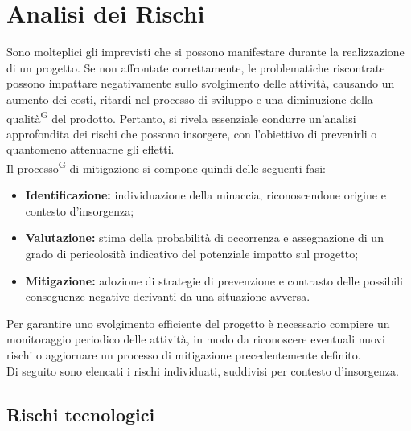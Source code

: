 \documentclass[8pt]{article}
\newcommand{\glossterm}[1]{#1\textsuperscript{G}} %
\begin{document}
\section{Analisi dei Rischi} \label{sec:rischi}
Sono molteplici gli imprevisti che si possono manifestare durante la realizzazione di un progetto. Se non affrontate correttamente, le problematiche riscontrate possono impattare negativamente sullo svolgimento delle attività, causando un aumento dei costi, ritardi nel processo di sviluppo e una diminuzione della \glossterm{qualità} del prodotto. Pertanto, si rivela essenziale condurre un'analisi approfondita dei rischi che possono insorgere, con l'obiettivo di prevenirli o quantomeno attenuarne gli effetti. \\
Il \glossterm{processo} di mitigazione si compone quindi delle seguenti fasi: 
\begin{itemize}
\setlength\itemsep{0em}
    \item \textbf{Identificazione:} individuazione della minaccia, riconoscendone origine e contesto d'insorgenza;
    \item \textbf{Valutazione:} stima della probabilità di occorrenza e assegnazione di un grado di pericolosità indicativo del potenziale impatto sul progetto;
    \item \textbf{Mitigazione:} adozione di strategie di prevenzione e contrasto delle possibili conseguenze negative derivanti da una situazione avversa.
\end{itemize}
Per garantire uno svolgimento efficiente del progetto è necessario compiere un monitoraggio periodico delle attività, in modo da riconoscere eventuali nuovi rischi o aggiornare un processo di mitigazione precedentemente definito. \\ Di seguito sono elencati i rischi individuati, suddivisi per contesto d'insorgenza.

\subsection{Rischi tecnologici}
\end{document}
